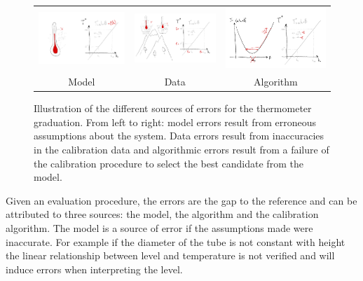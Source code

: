 \begin{bibunit}
\begin{figure}
\begin{tabular}{c|c|c}
     \hspace{-.15\linewidth}\includegraphics[width=.4\linewidth]{Introduction/pics/model_err_w_source.png}  &
     \includegraphics[width=.4\linewidth]{Introduction/pics/data_err_w_source.png} &
     \includegraphics[width=.4\linewidth]{Introduction/pics/optim_err_w_source.png} \\
     \hspace{-.15\linewidth}Model &  Data &  Algorithm \\
\end{tabular}
    \centering
    \caption{Illustration of the different sources of errors for the thermometer graduation. From left to right: model errors result from erroneous assumptions about the system. Data errors result from inaccuracies in the calibration data and algorithmic errors result from a failure of the calibration procedure to select the best candidate from the model.}
    \label{fig:err_sources}
\end{figure}
Given an evaluation procedure, the errors are the gap to the reference and can be attributed to three sources: the model, the algorithm and the calibration algorithm.
 The model is a source of error if the assumptions made were inaccurate. For example if the diameter of the tube is not constant with height the linear relationship between level and temperature is not verified and will induce errors when interpreting the level.


\end{bibunit}

